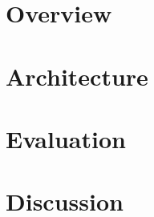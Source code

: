 \section{\dthreads{} Overview}


\section{\dthreads{} Architecture}


\section{Evaluation}


\section{Discussion}


